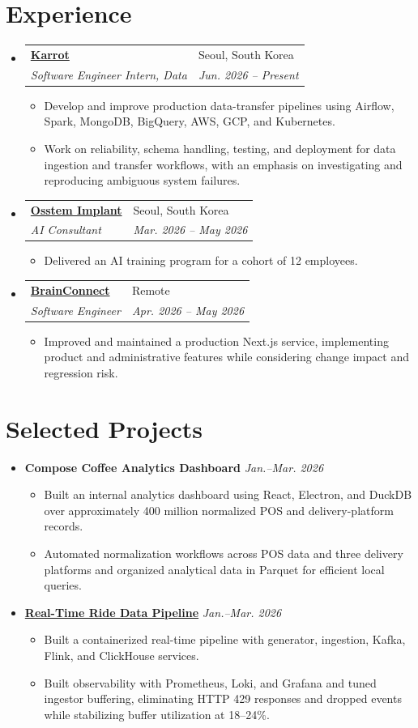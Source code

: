 \documentclass[letterpaper,11pt]{article}
\makeatletter
\newcommand{\resumeSubheading}[4]{
  \item
    \begin{tabularx}{0.98\textwidth}{@{}>{\raggedright\arraybackslash}X >{\raggedleft\arraybackslash}p{0.40\textwidth}@{}}
      \textbf{#1} & #2 \\
      \textit{#3} & \textit{#4} \\
    \end{tabularx}\vspace{-5pt}
}
\newcommand{\resumeItemListStart}{\begin{itemize}[leftmargin=0.18in,itemsep=1pt,topsep=2pt]}
\newcommand{\resumeItemListEnd}{\end{itemize}\vspace{-4pt}}
\newcommand{\resumeSubHeadingListStart}{\begin{itemize}[leftmargin=0in,label={},itemsep=3pt,topsep=2pt]}
\newcommand{\resumeSubHeadingListEnd}{\end{itemize}}
\makeatother
\begin{document}
\section{Experience}
\resumeSubHeadingListStart
  \resumeSubheading
    {\href{https://www.karrotmarket.com/about/}{Karrot}}{Seoul, South Korea}
    {Software Engineer Intern, Data}{Jun. 2026 -- Present}
    \resumeItemListStart
      \item\small{Develop and improve production data-transfer pipelines using Airflow, Spark, MongoDB, BigQuery, AWS, GCP, and Kubernetes.}
      \item\small{Work on reliability, schema handling, testing, and deployment for data ingestion and transfer workflows, with an emphasis on investigating and reproducing ambiguous system failures.}
    \resumeItemListEnd
  \resumeSubheading
    {\href{https://en.osstem.com/company/company-outline}{Osstem Implant}}{Seoul, South Korea}
    {AI Consultant}{Mar. 2026 -- May 2026}
    \resumeItemListStart
      \item\small{Delivered an AI training program for a cohort of 12 employees.}
    \resumeItemListEnd
  \resumeSubheading
    {\href{https://brainconnect.ai/en}{BrainConnect}}{Remote}
    {Software Engineer}{Apr. 2026 -- May 2026}
    \resumeItemListStart
      \item\small{Improved and maintained a production Next.js service, implementing product and administrative features while considering change impact and regression risk.}
    \resumeItemListEnd
\resumeSubHeadingListEnd

\section{Selected Projects}
\resumeSubHeadingListStart
  \item \textbf{Compose Coffee Analytics Dashboard} \hfill \textit{Jan.--Mar. 2026}
    \resumeItemListStart
      \item\small{Built an internal analytics dashboard using React, Electron, and DuckDB over approximately 400 million normalized POS and delivery-platform records.}
      \item\small{Automated normalization workflows across POS data and three delivery platforms and organized analytical data in Parquet for efficient local queries.}
    \resumeItemListEnd
  \item \textbf{\href{https://github.com/YBIGTA/27th-DE-WinterProject}{Real-Time Ride Data Pipeline}} \hfill \textit{Jan.--Mar. 2026}
    \resumeItemListStart
      \item\small{Built a containerized real-time pipeline with generator, ingestion, Kafka, Flink, and ClickHouse services.}
      \item\small{Built observability with Prometheus, Loki, and Grafana and tuned ingestor buffering, eliminating HTTP 429 responses and dropped events while stabilizing buffer utilization at 18--24\%.}
    \resumeItemListEnd
\resumeSubHeadingListEnd
\end{document}
